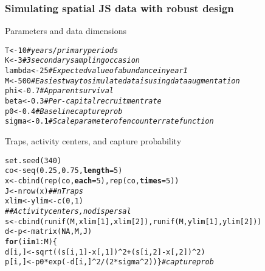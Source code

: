 \documentclass[color=usenames,dvipsnames]{beamer}\usepackage[]{graphicx}\usepackage[]{xcolor}
\makeatletter
\newcommand{\hlnum}[1]{\textcolor[rgb]{0.69,0.494,0}{#1}}%
\newcommand{\hlcom}[1]{\textcolor[rgb]{0.514,0.506,0.514}{\textit{#1}}}%
\newcommand{\hlopt}[1]{\textcolor[rgb]{0,0,0}{#1}}%
\newcommand{\hldef}[1]{\textcolor[rgb]{0,0,0}{#1}}%
\newcommand{\hlkwa}[1]{\textcolor[rgb]{0,0,0}{\textbf{#1}}}%
\newcommand{\hlkwb}[1]{\textcolor[rgb]{0,0.341,0.682}{#1}}%
\newcommand{\hlkwc}[1]{\textcolor[rgb]{0,0,0}{\textbf{#1}}}%
\newcommand{\hlkwd}[1]{\textcolor[rgb]{0.004,0.004,0.506}{#1}}%
\newenvironment{kframe}{%
 \def\at@end@of@kframe{}%
 \ifinner\ifhmode%
  \def\at@end@of@kframe{\end{minipage}}%
  \begin{minipage}{\columnwidth}%
 \fi\fi%
 \def\FrameCommand##1{\hskip\@totalleftmargin \hskip-\fboxsep
 \colorbox{shadecolor}{##1}\hskip-\fboxsep
     \hskip-\linewidth \hskip-\@totalleftmargin \hskip\columnwidth}%
 \MakeFramed {\advance\hsize-\width
   \@totalleftmargin\z@ \linewidth\hsize
   \@setminipage}}%
 {\par\unskip\endMakeFramed%
 \at@end@of@kframe}
\newenvironment{knitrout}{}{} %
\makeatother
\begin{document}
\begin{frame}[fragile]
  \frametitle{Simulating spatial JS data with robust design}
  {Parameters and data dimensions}
\begin{knitrout}\scriptsize
{}\color{fgcolor}\begin{kframe}
\begin{alltt}
\hldef{T} \hlkwb{<-} \hlnum{10}      \hlcom{# years/primary periods}
\hldef{K} \hlkwb{<-} \hlnum{3}       \hlcom{# 3 secondary sampling occasion}
\hldef{lambda} \hlkwb{<-} \hlnum{25} \hlcom{# Expected value of abundance in year 1}
\hldef{M} \hlkwb{<-} \hlnum{500}     \hlcom{# Easiest way to simulate data is using data augmentation}
\hldef{phi} \hlkwb{<-} \hlnum{0.7}   \hlcom{# Apparent survival}
\hldef{beta} \hlkwb{<-} \hlnum{0.3} \hlcom{# Per-capital recruitment rate}
\hldef{p0} \hlkwb{<-} \hlnum{0.4}    \hlcom{# Baseline capture prob}
\hldef{sigma} \hlkwb{<-} \hlnum{0.1} \hlcom{# Scale parameter of encounter rate function}
\end{alltt}
\end{kframe}
\end{knitrout}
\pause
{Traps, activity centers, and capture probability}
\begin{knitrout}\scriptsize
{}\color{fgcolor}\begin{kframe}
\begin{alltt}
\hlkwd{set.seed}\hldef{(}\hlnum{340}\hldef{)}
\hldef{co} \hlkwb{<-} \hlkwd{seq}\hldef{(}\hlnum{0.25}\hldef{,} \hlnum{0.75}\hldef{,} \hlkwc{length}\hldef{=}\hlnum{5}\hldef{)}
\hldef{x} \hlkwb{<-} \hlkwd{cbind}\hldef{(}\hlkwd{rep}\hldef{(co,} \hlkwc{each}\hldef{=}\hlnum{5}\hldef{),} \hlkwd{rep}\hldef{(co,} \hlkwc{times}\hldef{=}\hlnum{5}\hldef{))}
\hldef{J} \hlkwb{<-} \hlkwd{nrow}\hldef{(x)}  \hlcom{## nTraps}
\hldef{xlim} \hlkwb{<-} \hldef{ylim} \hlkwb{<-} \hlkwd{c}\hldef{(}\hlnum{0}\hldef{,}\hlnum{1}\hldef{)}
\hlcom{## Activity centers, no dispersal}
\hldef{s} \hlkwb{<-} \hlkwd{cbind}\hldef{(}\hlkwd{runif}\hldef{(M, xlim[}\hlnum{1}\hldef{], xlim[}\hlnum{2}\hldef{]),} \hlkwd{runif}\hldef{(M, ylim[}\hlnum{1}\hldef{], ylim[}\hlnum{2}\hldef{]))}
\hldef{d} \hlkwb{<-} \hldef{p} \hlkwb{<-} \hlkwd{matrix}\hldef{(}\hlnum{NA}\hldef{, M, J)}
\hlkwa{for}\hldef{(i} \hlkwa{in} \hlnum{1}\hlopt{:}\hldef{M) \{}
    \hldef{d[i,]} \hlkwb{<-} \hlkwd{sqrt}\hldef{((s[i,}\hlnum{1}\hldef{]}\hlopt{-}\hldef{x[,}\hlnum{1}\hldef{])}\hlopt{^}\hlnum{2} \hlopt{+} \hldef{(s[i,}\hlnum{2}\hldef{]}\hlopt{-}\hldef{x[,}\hlnum{2}\hldef{])}\hlopt{^}\hlnum{2}\hldef{)}
    \hldef{p[i,]} \hlkwb{<-} \hldef{p0}\hlopt{*}\hlkwd{exp}\hldef{(}\hlopt{-}\hldef{d[i,]}\hlopt{^}\hlnum{2}\hlopt{/}\hldef{(}\hlnum{2}\hlopt{*}\hldef{sigma}\hlopt{^}\hlnum{2}\hldef{)) \}} \hlcom{# capture prob }
\end{alltt}
\end{kframe}
\end{knitrout}
\end{frame}
\end{document}
